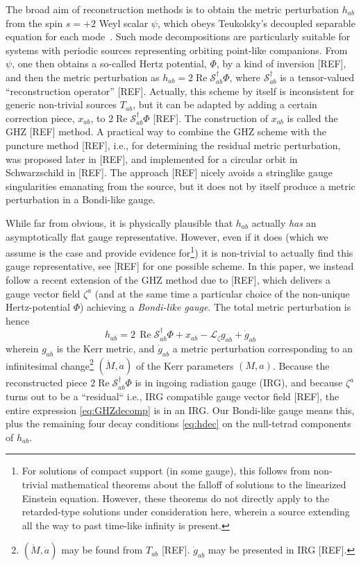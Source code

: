 \documentclass[%
reprint,
 prd,
superscriptaddress,
nofootinbib,
aps,
dvipsnames
]{revtex4-2}
\renewcommand{\S}{{\mathcal S}}
\renewcommand{\L}{{\mathcal L}}
\renewcommand{\Re}{\operatorname{Re}}
\begin{document}
The broad aim of reconstruction methods is to obtain the metric perturbation $h_{ab}$ from the spin $s=+2$ Weyl scalar $\psi$, which obeys Teukolsky's decoupled separable equation for each mode~\cite{Teukolsky:1973ha}. Such mode decompositions are particularly suitable for systems with periodic sources representing orbiting point-like companions. From $\psi$, one then obtains a so-called Hertz potential, $\Phi$, by a kind of inversion [REF], and then the metric perturbation as $h_{ab} = 2\Re \S^\dagger_{ab} \Phi$, where $\S^\dagger_{ab}$ is a tensor-valued ``reconstruction operator'' [REF]. Actually, this scheme by itself is inconsistent for generic non-trivial sources $T_{ab}$, but it can be adapted by adding a certain correction piece, $x_{ab}$, to $2\Re \S^\dagger_{ab} \Phi$
[REF]. The construction of $x_{ab}$ is called the GHZ [REF] method. A practical way to combine the GHZ scheme with the puncture method [REF], i.e., for determining the residual metric perturbation, was proposed later in [REF], and implemented for a circular orbit in Schwarzschild in [REF]. The approach [REF] nicely avoids a stringlike gauge singularities emanating from the source, but it does not by itself produce a metric perturbation in a Bondi-like gauge. 

While far from obvious, it is physically plausible that $h_{ab}$ actually {\it has} an asymptotically flat gauge representative. However, even if it does (which we assume is the case and provide evidence for\footnote{For solutions of compact support (in some gauge), this follows from non-trivial mathematical theorems about the falloff of solutions to the linearized Einstein equation. However, these theorems do not directly apply to the retarded-type solutions under consideration here, wherein a source extending all the way to past time-like infinity is present.}) it is non-trivial to actually find this gauge representative, see [REF] for one possible scheme. In this paper, we instead follow a recent extension of the GHZ method due to [REF], which delivers a gauge vector field $\zeta^a$
(and at the same time a particular choice of the non-unique Hertz-potential $\Phi$) achieving a {\it Bondi-like gauge}. The total metric perturbation is hence
\begin{equation}
\label{eq:GHZdecomp}
    h_{ab} = 2\,\Re \S^\dagger_{ab} \Phi + x_{ab} -\L_\zeta g_{ab} + \dot g_{ab}
\end{equation}
wherein $g_{ab}$ is the Kerr metric, and $\dot g_{ab}$ a metric perturbation corresponding to an infinitesimal change\footnote{$(\dot M, \dot a)$ may be found from $T_{ab}$ [REF]. $\dot g_{ab}$ may be presented in IRG [REF].} $(\dot M, \dot a)$ of the Kerr parameters $(M,a)$. 
Because the reconstructed piece $2 \Re \S^\dagger_{ab} \Phi$ is in ingoing radiation gauge (IRG), and because $\zeta^a$
turns out to be a ``residual`` i.e., IRG compatible gauge vector field [REF], the entire expression \eqref{eq:GHZdecomp} is in an IRG. Our Bondi-like gauge means this, plus the remaining four decay conditions \eqref{eq:hdec} on the null-tetrad components of $h_{ab}$.
\end{document}
